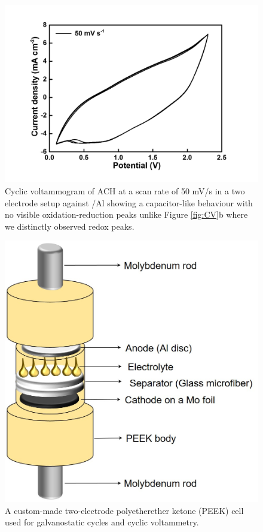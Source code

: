 \documentclass{article}
\begin{document}
\begin{figure}[th!]
\centering
\includegraphics[width=\textwidth]{fig/hair50mVs}
\caption{Cyclic voltammogram of ACH at a scan rate of 50 mV/s in a two electrode setup against /Al showing a capacitor-like behaviour with no visible oxidation-reduction peaks unlike Figure \ref{fig:CV}b where we distinctly observed redox peaks.}
\label{fig:hair50mVs}
\end{figure}

\begin{figure}[th!]
\centering
\includegraphics[width=\textwidth]{fig/PEEK}
\caption{A custom-made two-electrode polyetherether ketone (PEEK) cell used for galvanostatic cycles and cyclic voltammetry.}
\label{fig:PEEK}
\end{figure}
\end{document}
